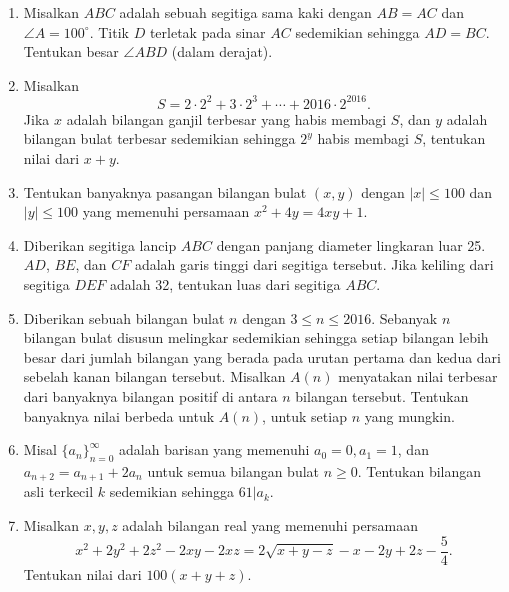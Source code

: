 \documentclass[a4paper,12pt]{article}
\begin{document}
\begin{enumerate}
\item Misalkan $ABC$ adalah sebuah segitiga sama kaki dengan $AB=AC$ dan $\angle A=100^\circ$. Titik $D$ terletak pada sinar $AC$ sedemikian sehingga $AD=BC$. Tentukan besar $\angle ABD$ (dalam derajat).

\item Misalkan $$S = 2 \cdot 2^2 + 3 \cdot 2^3 + \cdots + 2016 \cdot 2^{2016}.$$ Jika $x$ adalah bilangan ganjil terbesar yang habis membagi $S$, dan $y$ adalah bilangan bulat terbesar sedemikian sehingga $2^y$ habis membagi $S$, tentukan nilai dari $x + y$.

\item Tentukan banyaknya pasangan bilangan bulat $(x,y)$ dengan $|x|\leq 100$ dan $|y|\leq 100$ yang memenuhi persamaan $x^2+4y=4xy+1$.

\item Diberikan segitiga lancip $ABC$ dengan panjang diameter lingkaran luar 25. $AD$, $BE$, dan $CF$ adalah garis tinggi dari segitiga tersebut. Jika keliling dari segitiga $DEF$ adalah 32, tentukan luas dari segitiga $ABC$.

\item Diberikan sebuah bilangan bulat $n$ dengan $3 \le n \le 2016$. Sebanyak $n$ bilangan bulat disusun melingkar sedemikian sehingga setiap bilangan lebih besar dari jumlah bilangan yang berada pada urutan pertama dan kedua dari sebelah kanan bilangan tersebut. Misalkan $A(n)$ menyatakan nilai terbesar dari banyaknya bilangan positif di antara $n$ bilangan tersebut. Tentukan banyaknya nilai berbeda untuk $A(n)$, untuk setiap $n$ yang mungkin.

\item Misal $\{a_n\}_{n=0}^{\infty}$ adalah barisan yang memenuhi $a_0 = 0, a_1 = 1$, dan $a_{n+2} = a_{n+1}+2a_n$ untuk semua bilangan bulat $n \geq 0$. Tentukan bilangan asli terkecil $k$ sedemikian sehingga $61 | a_k$.

\item Misalkan $x,y,z$ adalah bilangan real yang memenuhi persamaan \[x^2+2y^2+2z^2-2xy-2xz=2\sqrt{x+y-z}-x-2y+2z-\frac{5}{4}.\] Tentukan nilai dari $100(x+y+z)$.
\end{enumerate}

\newpage
\end{document}
